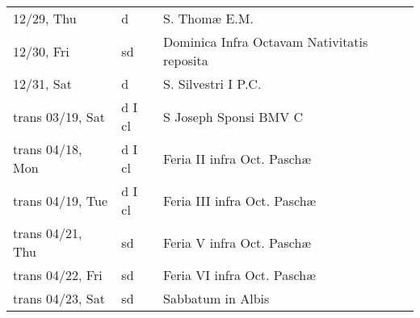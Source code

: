 \documentclass[10pt]{article}
\begin{document}
\begin{longtable}{ l l l }
12/29, Thu & d & S. Thomæ E.M.\\
12/30, Fri & sd & Dominica Infra Octavam Nativitatis reposita\\
12/31, Sat & d & S. Silvestri I P.C.\\
trans 03/19, Sat & d I cl & S Joseph Sponsi BMV C\\
trans 04/18, Mon & d I cl & Feria II infra Oct. Paschæ\\
trans 04/19, Tue & d I cl & Feria III infra Oct. Paschæ\\
trans 04/21, Thu & sd & Feria V infra Oct. Paschæ\\
trans 04/22, Fri & sd & Feria VI infra Oct. Paschæ\\
trans 04/23, Sat & sd & Sabbatum in Albis\\
\end{longtable}
\end{document}
